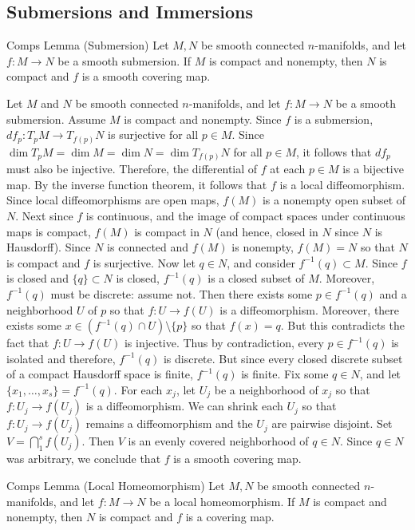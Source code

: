 \documentclass{article}
\begin{document}
	\newpage 
	\subsection{Submersions and Immersions}
	\begin{prb}{Comps Lemma (Submersion)}
		Let $M, N$ be smooth connected $n$-manifolds, and let $f: M\to N$ be a smooth submersion. If $M$ is compact and nonempty, then $N$ is compact and $f$ is a smooth covering map. 
	\end{prb}
	Let $M$ and $N$ be smooth connected $n$-manifolds, and let $f: M \to N$ be a smooth submersion. Assume $M$ is compact and nonempty. Since $f$ is a submersion, $df_{p}: T_{p}M \to T_{f(p)}N$ is surjective for all $p \in M$. Since $\dim{T_{p}M} = \dim{M} = \dim{N} = \dim{T_{f(p)}N}$ for all $p \in M$, it follows that $df_{p}$ must also be injective. Therefore, the differential of $f$ at each $p \in M$ is a bijective map. By the inverse function theorem, it follows that $f$ is a local diffeomorphism. Since local diffeomorphisms are open maps, $f(M)$ is a nonempty open subset of $N$. Next since $f$ is continuous, and the image of compact spaces under continuous maps is compact, $f(M)$ is compact in $N$ (and hence, closed in $N$ since $N$ is Hausdorff). Since $N$ is connected and $f(M)$ is nonempty, $f(M) = N$ so that $N$ is compact and $f$ is surjective. Now let $q \in N$, and consider $f^{-1}(q) \subset M$. Since $f$ is closed and $\{q\} \subset N$ is closed, $f^{-1}(q)$ is a closed subset of $M$. Moreover, $f^{-1}(q)$ must be discrete: assume not. Then there exists some $p \in f^{-1}(q)$ and a neighborhood $U$ of $p$ so that $f: U  \to f(U)$ is a diffeomorphism. Moreover, there exists some $x \in (f^{-1}(q) \cap U)\setminus \{p\}$ so that $f(x) = q$. But this contradicts the fact that $f: U \to f(U)$ is injective. Thus by contradiction, every $p \in f^{-1}(q)$ is isolated and therefore, $f^{-1}(q)$ is discrete. But since every closed discrete subset of a compact Hausdorff space is finite, $f^{-1}(q)$ is finite. Fix some $q \in N$, and let $\{x_{1}, \ldots, x_{s}\} = f^{-1}(q)$. For each $x_{j}$, let $U_{j}$ be a neighborhood of $x_{j}$ so that $f: U_{j} \to f(U_{j})$ is a diffeomorphism. We can shrink each $U_{j}$ so that $f: U_{j} \to f(U_{j})$ remains a diffeomorphism and the $U_{j}$ are pairwise disjoint. Set $V = \bigcap_{1}^{s}f(U_{j})$. Then $V$ is an evenly covered neighborhood of $q \in N$. Since $q \in N$ was arbitrary, we conclude that $f$ is a smooth covering map. 
	
	\begin{prb}{Comps Lemma (Local Homeomorphism)}
		Let $M, N$ be smooth connected $n$-manifolds, and let $f: M \to N$ be a local homeomorphism. If $M$ is compact and nonempty, then $N$ is compact and $f$ is a covering map. 
	\end{prb}
	
\end{document}
